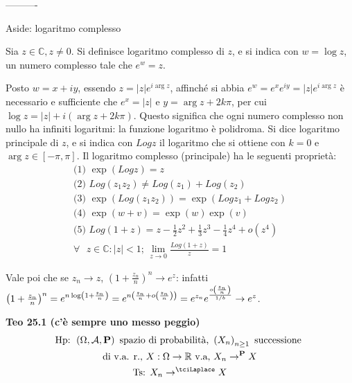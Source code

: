 \documentclass{article}
\begin{document}
----------

Aside: logaritmo complesso

Sia $z\in 
\mathbb{C}
,z\neq 0$. Si definisce logaritmo complesso di $z$, e si indica con $w=\log
z $, un numero complesso tale che $e^{w}=z$.

Posto $w=x+iy$, essendo $z=\left\vert z\right\vert e^{i\arg z}$, affinch\'{e}
si abbia $e^{w}=e^{x}e^{iy}=\left\vert z\right\vert e^{i\arg z}$ \`{e}
necessario e sufficiente che $e^{x}=\left\vert z\right\vert $ e $y=\arg
z+2k\pi $, per cui $\log z=\left\vert z\right\vert +i\left( \arg z+2k\pi
\right) $. Questo significa che ogni numero complesso non nullo ha infiniti
logaritmi: la funzione logaritmo \`{e} polidroma. Si dice logaritmo
principale di $z$, e si indica con $Logz$ il logaritmo che si ottiene con $%
k=0$ e $\arg z\in \left[ -\pi ,\pi \right] $. Il logaritmo complesso
(principale) ha le seguenti propriet\`{a}:%
\begin{gather*}
\text{(1) }\exp \left( Logz\right) =z \\
\text{(2) }Log\left( z_{1}z_{2}\right) \neq Log\left( z_{1}\right)
+Log\left( z_{2}\right) \\
\text{(3) }\exp \left( Log\left( z_{1}z_{2}\right) \right) =\exp \left(
Logz_{1}+Logz_{2}\right) \\
\text{(4) }\exp \left( w+v\right) =\exp \left( w\right) \exp \left( v\right)
\\
\text{(5) }Log\left( 1+z\right) =z-\frac{1}{2}z^{2}+\frac{1}{3}z^{3}-\frac{1%
}{4}z^{4}+o\left( z^{4}\right) \\
\forall \text{ }z\in 
\mathbb{C}
:\left\vert z\right\vert <1\text{; }\lim_{z\rightarrow 0}\frac{Log\left(
1+z\right) }{z}=1
\end{gather*}

Vale poi che se $z_{n}\rightarrow z$, $\left( 1+\frac{z_{n}}{n}\right)
^{n}\rightarrow e^{z}$: infatti $\left( 1+\frac{z_{n}}{n}\right)
^{n}=e^{n\log \left( 1+\frac{z_{n}}{n}\right) }=e^{n\left( \frac{z_{n}}{n}%
+o\left( \frac{z_{n}}{n}\right) \right) }=e^{z_{n}}e^{\frac{o\left( \frac{%
z_{n}}{n}\right) }{1/b}}\rightarrow e^{z}$.

\textbf{Teo 25.1 (c'\`{e} sempre uno messo peggio)}%
\begin{gather*}
\text{Hp: }\left( \Omega ,\mathcal{A},\mathbf{P}\right) \text{ spazio di
probabilit\`{a}, }\left( X_{n}\right) _{n\geq 1}\text{ successione } \\
\text{di v.a. r., }X:\Omega \rightarrow 
\mathbb{R}
\text{ v.a, }X_{n}\rightarrow ^{\mathbf{P}}X \\
\text{Ts: }X_{n}\rightarrow ^{\tciLaplace }X
\end{gather*}
\end{document}
